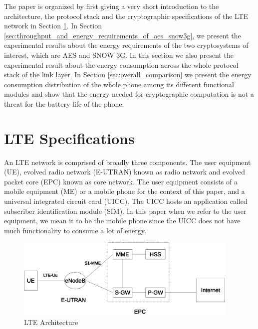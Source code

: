 \documentclass[lnicst,sechang,a4paper]{svmultln}
\begin{document}
The paper is organized by first giving a very short introduction to the architecture, the protocol stack and the cryptographic specifications of the LTE network in Section \ref{sec:lte_specifications}. In Section \ref{sec:throughput_and_energy_requirements_of_aes_snow3g}, we present the experimental results about the energy requirements of the two cryptosystems of interest, which are AES and SNOW 3G. In this section we also present the experimental result about the energy consumption across the whole protocol stack of the link layer. In Section \ref{sec:overall_comparison} we present the energy consumption distribution of the whole phone among its different functional modules and show that the energy needed for cryptographic computation is not a threat for the battery life of the phone. 

\section{LTE Specifications}
\label{sec:lte_specifications}
An LTE network is comprised of broadly three components. The user equipment (UE), evolved radio network (E-UTRAN) known as radio network and evolved packet core (EPC) known as core network. The user equipment consists of a mobile equipment (ME) or a mobile phone for the context of this paper, and a universal integrated circuit card (UICC). The UICC hosts an application called subscriber identification module (SIM). In this paper when we refer to the user equipment, we mean it to be the mobile phone since the UICC does not have much functionality to consume a lot of energy.

\begin{figure}
\begin{center}
  \includegraphics[width=0.95\textwidth]{lte_architecture.eps}
\caption{LTE Architecture}
\label{fig:protocl_stack}       %
\end{center}
\end{figure}
\end{document}
